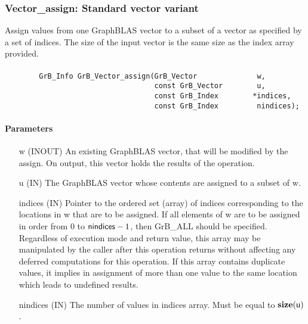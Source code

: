 \subsubsection{{\sf Vector\_assign}: Standard vector variant}

Assign values from one GraphBLAS vector to a subset of a 
vector as specified by a set of indices. The size of the input vector is the
same size as the index array provided.

\paragraph{\syntax}

\begin{verbatim}
        GrB_Info GrB_Vector_assign(GrB_Vector              w,
                                   const GrB_Vector        u,
                                   const GrB_Index        *indices,
                                   const GrB_Index         nindices);
\end{verbatim}

\paragraph{Parameters}

\begin{itemize}[leftmargin=1in]
    \item[{\sf w}] ({\sf INOUT}) An existing GraphBLAS vector, that will
    be modified by the assign.  On output, this vector holds the results
    of the operation.

    \item[{\sf u}] ({\sf IN}) The GraphBLAS vector whose contents are
    assigned to a subset of {\sf w}.

    \item[{\sf indices}] ({\sf IN}) Pointer to the ordered set (array)
    of indices corresponding to the locations in {\sf w} that are to be
    assigned.  If all elements of {\sf w} are to be assigned in order from
    $0$ to ${\sf nindices} - 1$, then {\sf GrB\_ALL} should be specified.
    Regardless of execution mode and return value, this array may be
    manipulated by the caller after this operation returns without
    affecting any deferred computations for this operation.  If this
    array contains duplicate values, it implies in assignment of more
    than one value to the same location which leads to undefined results.

    \item[{\sf nindices}] ({\sf IN}) The number of values in {\sf
    indices} array.  Must be equal to $\bold{size}({\sf u})$.
\end{itemize}

